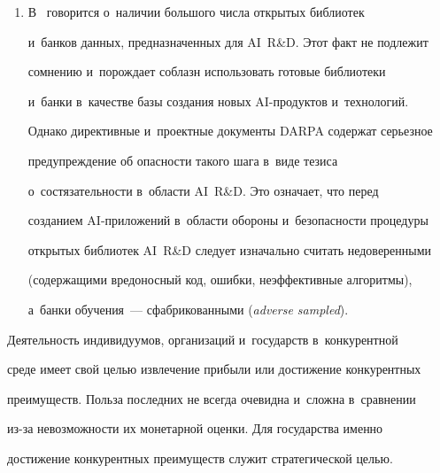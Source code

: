 \begin{enumerate}[1.]
прикладной выигрыш в~будущем. Из анализа кон\-кур\-сов\!/\!про\-ек\-тов следует,


что государство не финансирует проекты, сомнительные с~точки зрения


их выполнимости (сомнение в~существовании решения поставленной


задачи, некорректность или размытость в~постановке задачи, отсутствие


современной или перспективной ап\-па\-рат\-но-про\-грам\-мной базы для


решения задачи).


\item %


В~\cite{3-bor} говорится о~наличии большого числа открытых библиотек


и~банков данных, предназначенных для AI~R\&D. Этот факт не подлежит


сомнению и~порождает соблазн использовать готовые биб\-лио\-те\-ки


и~банки в~качестве базы создания новых AI-про\-дук\-тов и~технологий.


Однако директивные и~проектные документы DARPA содержат серьезное


предупреждение об опас\-ности такого шага в~виде тезиса


о~состязательности в~области AI~R\&D. Это означает, что перед


созданием AI-при\-ло\-же\-ний в~об\-ласти обороны и~безопас\-ности процедуры


открытых библиотек AI~R\&D следует изначально считать недоверенными


(содержащими вредоносный код, ошибки, неэффективные алгоритмы),


а~банки обуче\-ния~--- сфабрикованными (\textit{adverse sampled}).


  \end{enumerate}





  Деятельность индивидуумов, организаций и~государств в~конкурентной


среде имеет свой целью извлечение прибыли или достижение конкурентных


преимуществ. Польза последних не всегда очевидна и~сложна в~сравнении


из-за невозможности их монетарной оценки. Для государства именно


достижение конкурентных преимуществ служит стратегической целью.


